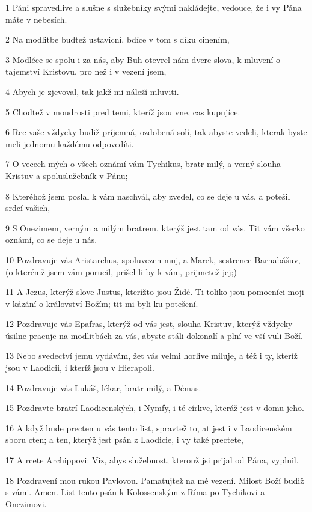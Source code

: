 \par 1 Páni spravedlive a slušne s služebníky svými nakládejte, vedouce, že i vy Pána máte v nebesích.
\par 2 Na modlitbe budtež ustavicní, bdíce v tom s díku cinením,
\par 3 Modléce se spolu i za nás, aby Buh otevrel nám dvere slova, k mluvení o tajemství Kristovu, pro než i v vezení jsem,
\par 4 Abych je zjevoval, tak jakž mi náleží mluviti.
\par 5 Chodtež v moudrosti pred temi, kteríž jsou vne, cas kupujíce.
\par 6 Rec vaše vždycky budiž príjemná, ozdobená solí, tak abyste vedeli, kterak byste meli jednomu každému odpovedíti.
\par 7 O vecech mých o všech oznámí vám Tychikus, bratr milý, a verný slouha Kristuv a spoluslužebník v Pánu;
\par 8 Kteréhož jsem poslal k vám naschvál, aby zvedel, co se deje u vás, a potešil srdcí vašich,
\par 9 S Onezimem, verným a milým bratrem, kterýž jest tam od vás. Tit vám všecko oznámí, co se deje u nás.
\par 10 Pozdravuje vás Aristarchus, spoluvezen muj, a Marek, sestrenec Barnabášuv, (o kterémž jsem vám porucil, prišel-li by k vám, prijmetež jej;)
\par 11 A Jezus, kterýž slove Justus, kterížto jsou Židé. Ti toliko jsou pomocníci moji v kázání o království Božím; tit mi byli ku potešení.
\par 12 Pozdravuje vás Epafras, kterýž od vás jest, slouha Kristuv, kterýž vždycky úsilne pracuje na modlitbách za vás, abyste stáli dokonalí a plní ve vší vuli Boží.
\par 13 Nebo svedectví jemu vydávám, žet vás velmi horlive miluje, a též i ty, kteríž jsou v Laodicii, i kteríž jsou v Hierapoli.
\par 14 Pozdravuje vás Lukáš, lékar, bratr milý, a Démas.
\par 15 Pozdravte bratrí Laodicenských, i Nymfy, i té církve, kteráž jest v domu jeho.
\par 16 A když bude precten u vás tento list, spravtež to, at jest i v Laodicenském sboru cten; a ten, kterýž jest psán z Laodicie, i vy také prectete,
\par 17 A rcete Archippovi: Viz, abys služebnost, kterouž jsi prijal od Pána, vyplnil.
\par 18 Pozdravení mou rukou Pavlovou. Pamatujtež na mé vezení. Milost Boží budiž s vámi. Amen. List tento psán k Kolossenským z Ríma po Tychikovi a Onezimovi.


